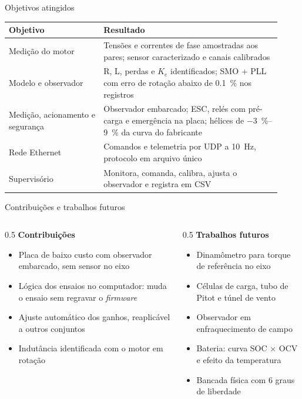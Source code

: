 
\begin{frame}{Objetivos atingidos}
  \small
  \begin{tabular}{p{0.32\linewidth}p{0.6\linewidth}}
    \toprule
    \textbf{Objetivo} & \textbf{Resultado} \\
    \midrule
    Medição do motor & Tensões e correntes de fase amostradas aos pares;
      sensor caracterizado e canais calibrados \\
    Modelo e observador & R, L, perdas e $K_e$ identificados; SMO + PLL com
      erro de rotação abaixo de \SI{0,1}{\percent} nos registros \\
    Medição, acionamento e segurança & Observador embarcado; ESC, relés com
      pré-carga e emergência na placa; hélices de \SIrange{-3}{+9}{\percent}
      da curva do fabricante \\
    Rede Ethernet & Comandos e telemetria por UDP a \SI{10}{\hertz}, protocolo
      em arquivo único \\
    Supervisório & Monitora, comanda, calibra, ajusta o observador e registra
      em CSV \\
    \bottomrule
  \end{tabular}
\end{frame}

\begin{frame}{Contribuições e trabalhos futuros}
  \begin{columns}[t]
    \begin{column}{0.5\textwidth}
      \textbf{Contribuições}
      \begin{itemize}
        \small
        \item Placa de baixo custo com observador embarcado, sem sensor no
              eixo
        \item Lógica dos ensaios no computador: muda o ensaio sem regravar
              o \textit{firmware}
        \item Ajuste automático dos ganhos, reaplicável a outros conjuntos
        \item Indutância identificada com o motor em rotação
      \end{itemize}
    \end{column}
    \begin{column}{0.5\textwidth}
      \textbf{Trabalhos futuros}
      \begin{itemize}
        \small
        \item Dinamômetro para torque de referência no eixo
        \item Células de carga, tubo de Pitot e túnel de vento
        \item Observador em enfraquecimento de campo
        \item Bateria: curva SOC $\times$ OCV e efeito da temperatura
        \item Bancada física com 6 graus de liberdade
      \end{itemize}
    \end{column}
  \end{columns}
\end{frame}
